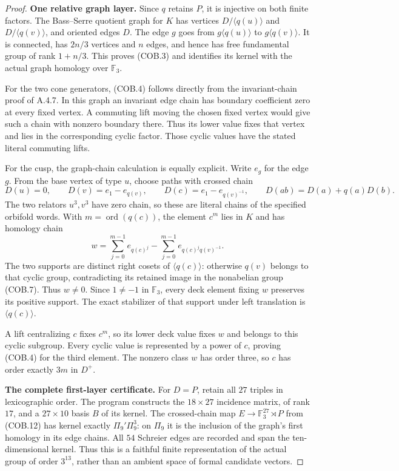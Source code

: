 \begin{proof}
\par\medskip\noindent\textbf{One relative graph layer.}\quad
Since $q$ retains $P$, it is injective on both finite
factors. The Bass--Serre quotient graph for $K$ has
vertices $D/\langle q(u)\rangle$ and
$D/\langle q(v)\rangle$, and oriented edges $D$.
The edge $g$ goes from $g\langle q(u)\rangle$ to
$g\langle q(v)\rangle$. It is connected, has
$2n/3$ vertices and $n$ edges, and hence has free
fundamental group of rank $1+n/3$. This proves
(COB.3) and identifies its kernel with the actual
graph homology over $\mathbb F_3$.

For the two cone generators, (COB.4) follows directly
from the invariant-chain proof of A.4.7. In this graph
an invariant edge chain has boundary coefficient zero
at every fixed vertex. A commuting lift moving the
chosen fixed vertex would give such a chain with
nonzero boundary there. Thus its lower value fixes
that vertex and lies in the corresponding cyclic
factor. Those cyclic values have the stated literal
commuting lifts.

For the cusp, the graph-chain calculation is equally
explicit. Write $e_g$ for the edge $g$. From the base
vertex of type $u$, choose paths with crossed chain
\[
 D(u)=0,\qquad D(v)=e_1-e_{q(v)},\qquad
 D(c)=e_1-e_{q(v)^{-1}},\qquad
 D(ab)=D(a)+q(a)D(b).
                                                               \tag{COB.12}
\]
The two relators $u^3,v^3$ have zero chain, so these
are literal chains of the specified orbifold words.
With $m=\operatorname{ord}(q(c))$, the element $c^m$
lies in $K$ and has homology chain
\[
        w=\sum_{j=0}^{m-1}e_{q(c)^j}
               -\sum_{j=0}^{m-1}e_{q(c)^jq(v)^{-1}}.
                                                               \tag{COB.13}
\]
The two supports are distinct right cosets of
$\langle q(c)\rangle$: otherwise $q(v)$ belongs to
that cyclic group, contradicting its retained image
in the nonabelian group (COB.7). Thus $w\ne0$.
Since $1\ne-1$ in $\mathbb F_3$, every deck element
fixing $w$ preserves its positive support. The exact
stabilizer of that support under left translation is
$\langle q(c)\rangle$.

A lift centralizing $c$ fixes $c^m$, so its lower
deck value fixes $w$ and belongs to this cyclic
subgroup. Every cyclic value is represented by a
power of $c$, proving (COB.4) for the third element.
The nonzero class $w$ has order three, so $c$ has
order exactly $3m$ in $D^+$.

\par\medskip\noindent\textbf{The complete first-layer certificate.}\quad
For $D=P$, retain all $27$ triples in lexicographic
order. The program
constructs the $18\times27$ incidence matrix, of
rank $17$, and a $27\times10$ basis $B$ of its
kernel. The crossed-chain map
$E\to\mathbb F_3^{27}\rtimes P$ from (COB.12)
has kernel exactly $\Pi_9'\Pi_9^3$: on $\Pi_9$
it is the inclusion of the graph's first homology
in its edge chains. All $54$ Schreier edges are
recorded and span the ten-dimensional kernel.
Thus this is a faithful finite representation of
the actual group of order $3^{13}$, rather than
an ambient space of formal candidate vectors.


\end{proof}
